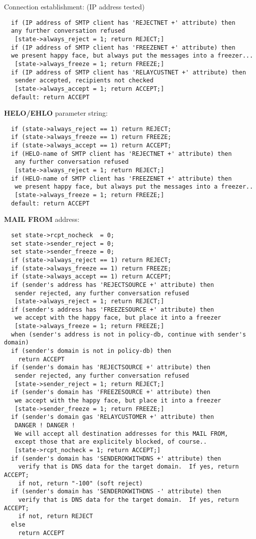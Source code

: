Connection establishment:  (IP address tested)

\begin{verbatim}
  if (IP address of SMTP client has 'REJECTNET +' attribute) then
  any further conversation refused
   [state->always_reject = 1; return REJECT;]
  if (IP address of SMTP client has 'FREEZENET +' attribute) then
  we present happy face, but always put the messages into a freezer...
   [state->always_freeze = 1; return FREEZE;]
  if (IP address of SMTP client has 'RELAYCUSTNET +' attribute) then
   sender accepted, recipients not checked
   [state->always_accept = 1; return ACCEPT;]
  default: return ACCEPT
\end{verbatim}


{\bf HELO/EHLO} parameter string:

\begin{verbatim}
  if (state->always_reject == 1) return REJECT;
  if (state->always_freeze == 1) return FREEZE;
  if (state->always_accept == 1) return ACCEPT;
  if (HELO-name of SMTP client has 'REJECTNET +' attribute) then
   any further conversation refused
   [state->always_reject = 1; return REJECT;]
  if (HELO-name of SMTP client has 'FREEZENET +' attribute) then
   we present happy face, but always put the messages into a freezer..
   [state->always_freeze = 1; return FREEZE;]
  default: return ACCEPT
\end{verbatim}


{\bf MAIL FROM} address:

\begin{verbatim}
  set state->rcpt_nocheck  = 0;
  set state->sender_reject = 0;
  set state->sender_freeze = 0;
  if (state->always_reject == 1) return REJECT;
  if (state->always_freeze == 1) return FREEZE;
  if (state->always_accept == 1) return ACCEPT;
  if (sender's address has 'REJECTSOURCE +' attribute) then
   sender rejected, any further conversation refused
   [state->always_reject = 1; return REJECT;]
  if (sender's address has 'FREEZESOURCE +' attribute) then
   we accept with the happy face, but place it into a freezer
   [state->always_freeze = 1; return FREEZE;]
  when (sender's address is not in policy-db, continue with sender's domain)
  if (sender's domain is not in policy-db) then
    return ACCEPT
  if (sender's domain has 'REJECTSOURCE +' attribute) then
   sender rejected, any further conversation refused
   [state->sender_reject = 1; return REJECT;]
  if (sender's domain has 'FREEZESOURCE +' attribute) then
   we accept with the happy face, but place it into a freezer
   [state->sender_freeze = 1; return FREEZE;]
  if (sender's domain gas 'RELAYCUSTOMER +' attribute) then
   DANGER ! DANGER !
   We will accept all destination addresses for this MAIL FROM,
   except those that are explicitely blocked, of course..
   [state->rcpt_nocheck = 1; return ACCEPT;]
  if (sender's domain has 'SENDEROKWITHDNS +' attribute) then
    verify that is DNS data for the target domain.  If yes, return ACCEPT;
    if not, return "-100" (soft reject)
  if (sender's domain has 'SENDEROKWITHDNS -' attribute) then
    verify that is DNS data for the target domain.  If yes, return ACCEPT;
    if not, return REJECT
  else
    return ACCEPT
\end{verbatim}


